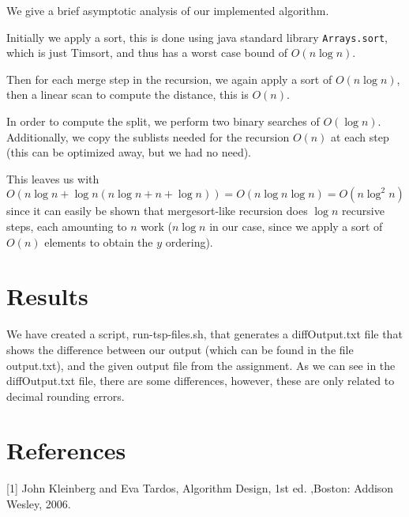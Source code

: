 \documentclass{tufte-handout}
\newcommand{\kleinbergtardos}{[1]}
\begin{document}
  We give a brief asymptotic analysis of our implemented algorithm.


  Initially we apply a sort,
  this is done using java standard library \verb+Arrays.sort+,
  which is just Timsort,
  and thus has a worst case bound of $O(n \log n)$.


  Then for each merge step in the recursion,
  we again apply a sort of $O(n \log n)$,
  then a linear scan to compute the distance, 
  this is $O(n)$.


  In order to compute the split,
  we perform two binary searches of $O(\log n)$.
  Additionally,
  we copy the sublists needed for the recursion $O(n)$
  at each step (this can be optimized away, but we had no need).


  This leaves us with  
  $O(n \log n + \log n (n \log n + n + \log n) ) = O(n \log n \log n) = O(n \log^2 n)$ 
  since it can easily be shown that mergesort-like recursion
  does $\log n$ recursive steps, each amounting to $n$ work 
  ($n \log n$ in our case, since we apply a sort of $O(n)$ elements to obtain the $y$ ordering).



  \section{Results}

  We have created a script, run-tsp-files.sh, that generates a 
  diffOutput.txt file that shows the difference between our output 
  (which can be found in the file output.txt), and the given output file from the assignment.
  As we can see in the diffOutput.txt file, there are some differences,
  however, these are only related to decimal rounding errors.


  \section{References}

  \kleinbergtardos \hspace{1em} John Kleinberg and Eva Tardos, Algorithm Design, 1st ed. ,Boston: Addison Wesley, 2006.
 
\end{document}
